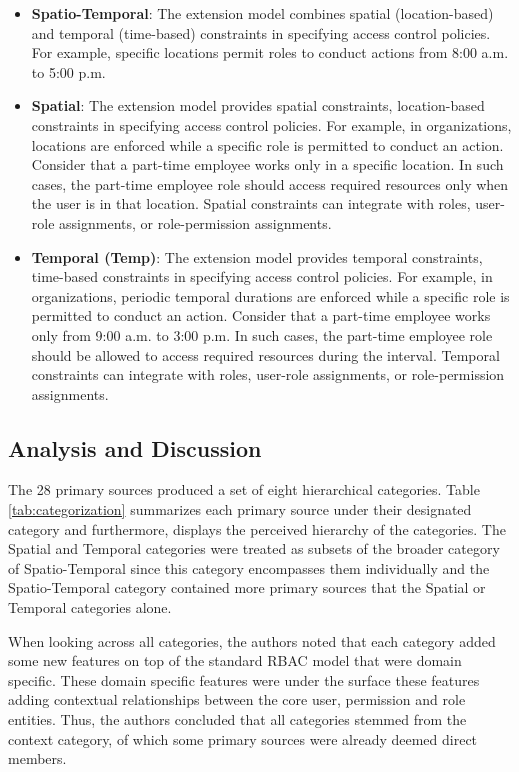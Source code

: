 \begin{itemize}
  \item \textbf{Spatio-Temporal}: The extension model combines spatial (location-based) and temporal (time-based) constraints in specifying access control policies. For example, specific locations permit roles to conduct actions from 8:00 a.m. to 5:00 p.m.

  \item \textbf{Spatial}: The extension model provides spatial constraints, location-based constraints in specifying access
	control policies. For example, in organizations, locations are enforced while a
	specific role is permitted to conduct an action. Consider that a part-time employee works only in a specific location.
	In such cases, the part-time employee role should access required resources only when the user is in that location. 
	Spatial constraints can integrate with roles, user-role assignments, or role-permission assignments. 

  \item \textbf{Temporal (Temp)}:  The extension model provides temporal constraints, time-based constraints in specifying access
	control policies. For example, in organizations, periodic temporal durations are enforced while a
	specific role is permitted to conduct an action. Consider that a part-time employee works only from 9:00 a.m. to 3:00 p.m.
	In such cases, the part-time employee role should be allowed to access required resources during the interval. 
	Temporal constraints can integrate with roles, user-role assignments, or role-permission assignments.   
	
\end{itemize}

\subsection{Analysis and Discussion}

The 28 primary sources produced a set of eight hierarchical categories. Table \ref{tab:categorization} summarizes each primary source under their designated
category and furthermore, displays the perceived hierarchy of the categories. 
The Spatial and Temporal categories were treated as subsets of the broader category of Spatio-Temporal since this category encompasses them individually and
the Spatio-Temporal category contained more primary sources that the Spatial or Temporal categories alone.  

When looking across all categories, the authors noted that each category added some new features on top of the standard RBAC model that were domain specific.
These domain specific features were under the surface these features adding contextual relationships between the core user, permission and role entities.  Thus, the authors
concluded that all categories stemmed from the context category, of which some primary sources were already deemed direct members.  

